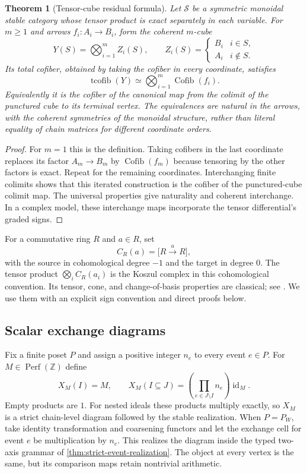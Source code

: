 \documentclass[11pt]{article}
\newtheorem{theorem}{Theorem}[section]
\theoremstyle{definition}
\theoremstyle{remark}
\newcommand{\Cofib}{\operatorname{Cofib}}
\newcommand{\id}{\operatorname{id}}
\begin{document}
\begin{theorem}[Tensor-cube residual formula]\label{thm:tensor-cube}
Let $\mathcal S$ be a symmetric monoidal stable category whose tensor product is exact separately in each variable. For $m\ge1$ and arrows $f_i:A_i\to B_i$, form the coherent $m$-cube
\[
 Y(S)=\bigotimes_{i=1}^m Z_i(S),\qquad
 Z_i(S)=\begin{cases}B_i&i\in S,\\A_i&i\notin S.\end{cases}
\]
Its total cofiber, obtained by taking the cofiber in every coordinate, satisfies
\[
 \operatorname{tcofib}(Y)\simeq
 \bigotimes_{i=1}^m\Cofib(f_i).
\]
Equivalently it is the cofiber of the canonical map from the colimit of the punctured cube to its terminal vertex. The equivalences are natural in the arrows, with the coherent symmetries of the monoidal structure, rather than literal equality of chain matrices for different coordinate orders.
\end{theorem}

\begin{proof}
For $m=1$ this is the definition. Taking cofibers in the last coordinate replaces its factor $A_m\to B_m$ by $\Cofib(f_m)$ because tensoring by the other factors is exact. Repeat for the remaining coordinates. Interchanging finite colimits shows that this iterated construction is the cofiber of the punctured-cube colimit map. The universal properties give naturality and coherent interchange. In a complex model, these interchange maps incorporate the tensor differential's graded signs.
\end{proof}

For a commutative ring $R$ and $a\in R$, set
\[
 C_R(a)=\bigl[R\xrightarrow{a}R\bigr],
\]
with the source in cohomological degree $-1$ and the target in degree $0$. The tensor product $\bigotimes_i C_R(a_i)$ is the Koszul complex in this cohomological convention. Its tensor, cone, and change-of-basis properties are classical; see \cite{StacksKoszul}. We use them with an explicit sign convention and direct proofs below.

\subsection{Scalar exchange diagrams}

Fix a finite poset $P$ and assign a positive integer $n_e$ to every event $e\in P$. For $M\in\operatorname{Perf}(\mathbb Z)$ define
\[
 X_M(I)=M,\qquad
 X_M(I\subseteq J)=\left(\prod_{e\in J\setminus I}n_e\right)\id_M.
\]
Empty products are $1$. For nested ideals these products multiply exactly, so $X_M$ is a strict chain-level diagram followed by the stable realization. When $P=P_W$, take identity transformation and coarsening functors and let the exchange cell for event $e$ be multiplication by $n_e$. This realizes the diagram inside the typed two-axis grammar of \cref{thm:strict-event-realization}. The object at every vertex is the same, but its comparison maps retain nontrivial arithmetic.
\end{document}
